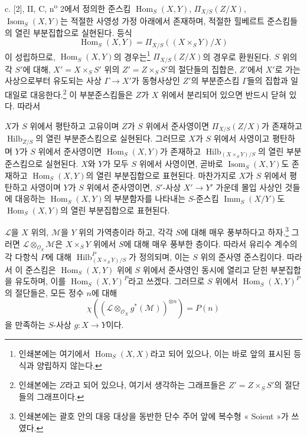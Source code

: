 \documentclass[11pt,twoside,openany]{book}
\numberwithin{equation}{section}
\newcommand{\sourceunit}{front}
\newcommand{\src}[1]{%
  \phantomsection\hypertarget{src:\sourceunit:#1}{}%
  \marginpar{\raggedleft\footnotesize\sffamily #1}%
}
\theoremstyle{plain}
\theoremstyle{definition}
\theoremstyle{remark}
\begin{document}
\medskip
\noindent c. [2], II, C, n\textsuperscript{o} 2에서 정의한 준스킴
$\operatorname{Hom}_S(X,Y)$, $\Pi_{X/S}(Z/X)$,
$\operatorname{Isom}_S(X,Y)$는 적절한 사영성 가정 아래에서 존재하며,
적절한 힐베르트 준스킴들의 열린 부분집합으로 실현된다. 등식
\[
\operatorname{Hom}_S(X,Y)=\Pi_{X/S}((X\times_SY)/X)
\]
이 성립하므로, $\operatorname{Hom}_S(X,Y)$의
경우는\footnote{인쇄본에는 여기에서
$\operatorname{Hom}_S(X,X)$라고 되어 있으나, 이는 바로 앞의 표시된
등식과 양립하지 않는다.} $\Pi_{X/S}(Z/X)$의 경우로 환원된다.
$S$ 위의 각 $S'$에 대해, $X'=X\times_SS'$ 위의
$Z'=Z\times_SS'$의 절단들의 집합은, $Z'$에서 $X'$로 가는 사상으로부터
유도되는 사상 $\Gamma\longrightarrow X'$가 동형사상인 $Z'$의
부분준스킴 $\Gamma$들의 집합과 일대일로 대응한다.\footnote{
인쇄본에는 $Z$라고 되어 있으나, 여기서 생각하는
그래프들은 $Z'=Z\times_SS'$의 절단들의 그래프이다.} 이 부분준스킴들은
$Z$가 $X$ 위에서 분리되어 있으면 반드시 닫혀 있다. 따라서
\src{268}
$X$가 $S$ 위에서 평탄하고 고유이며 $Z$가 $S$ 위에서 준사영이면
$\Pi_{X/S}(Z/X)$가 존재하고 $\operatorname{Hilb}_{Z/S}$의 열린
부분준스킴으로 실현된다. 그러므로 $X$가 $S$ 위에서 사영이고 평탄하며
$Y$가 $S$ 위에서 준사영이면 $\operatorname{Hom}_S(X,Y)$가 존재하고
$\operatorname{Hilb}_{(X\times_SY)/S}$의 열린 부분준스킴으로 실현된다.
$X$와 $Y$가 모두 $S$ 위에서 사영이면, 곧바로
$\operatorname{Isom}_S(X,Y)$도 존재하고
$\operatorname{Hom}_S(X,Y)$의 열린 부분집합으로 표현된다. 마찬가지로
$X$가 $S$ 위에서 평탄하고 사영이며 $Y$가 $S$ 위에서 준사영이면,
$S'$-사상 $X'\longrightarrow Y'$ 가운데 몰입 사상인 것들에 대응하는
$\operatorname{Hom}_S(X,Y)$의 부분함자를 나타내는 $S$-준스킴
$\operatorname{Imm}_S(X/Y)$도 $\operatorname{Hom}_S(X,Y)$의 열린
부분집합으로 표현된다.

$\mathcal L$을 $X$ 위의, $\mathcal M$을 $Y$ 위의 가역층이라 하고,
각각 $S$에 대해 매우 풍부하다고 하자.\footnote{인쇄본에는 괄호 안의 대응 대상을 동반한 단수 주어 앞에 복수형
« Soient »가 쓰였다.} 그러면
$\mathcal L\otimes_{\mathcal O_S}\mathcal M$은 $X\times_SY$ 위에서
$S$에 대해 매우 풍부한 층이다. 따라서 유리수 계수의 각 다항식 $P$에
대해 $\operatorname{Hilb}^P_{(X\times_SY)/S}$가 정의되며, 이는 $S$
위의 준사영 준스킴이다. 따라서 이 준스킴은
$\operatorname{Hom}_S(X,Y)$ 위에 $S$ 위에서 준사영인 동시에 열리고
닫힌 부분집합을 유도하며, 이를 $\operatorname{Hom}_S(X,Y)^P$라고
쓰겠다. 그러므로 $S$ 위에서 $\operatorname{Hom}_S(X,Y)^P$의 절단들은,
모든 정수 $n$에 대해
\[
\chi\!\left(\left(\mathcal L\otimes_{\mathcal O_X}g^*(\mathcal M)\right)^{
\otimes n}\right)=P(n)
\]
을 만족하는 $S$-사상 $g:X\longrightarrow Y$이다.
\end{document}
